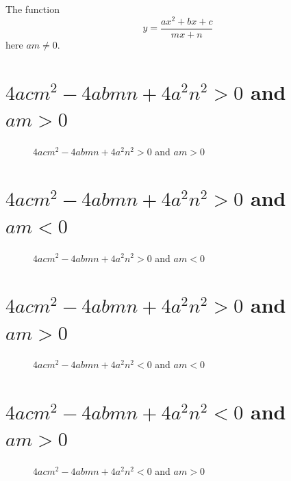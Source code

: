 \documentclass[12pt]{article}
\begin{document}
The function \[y = \dfrac{a x^2 + b x + c}{m x + n}\] here $a m \neq 0$.

\section{$4 a c m^2 - 4 a b m n + 4 a^2 n^2>0$ and $am>0$}
\begin{figure}[H]
  \centering
  \caption{$4 a c m^2 - 4 a b m n + 4 a^2 n^2>0$ and $am>0$}
\end{figure}

\section{$4 a c m^2 - 4 a b m n + 4 a^2 n^2>0$ and $am<0$}

\begin{figure}[H]
  \centering
  \caption{$4 a c m^2 - 4 a b m n + 4 a^2 n^2>0$ and $am<0$}
\end{figure}

\section{$4 a c m^2 - 4 a b m n + 4 a^2 n^2>0$ and $am>0$}

\begin{figure}[H]
  \centering
 \caption{$4 a c m^2 - 4 a b m n + 4 a^2 n^2<0$ and $am<0$}
\end{figure}

\section{$4 a c m^2 - 4 a b m n + 4 a^2 n^2<0$ and $am>0$}
\begin{figure}[H]
  \centering
 \caption{$4 a c m^2 - 4 a b m n + 4 a^2 n^2<0$ and $am>0$}
\end{figure}
\end{document}
